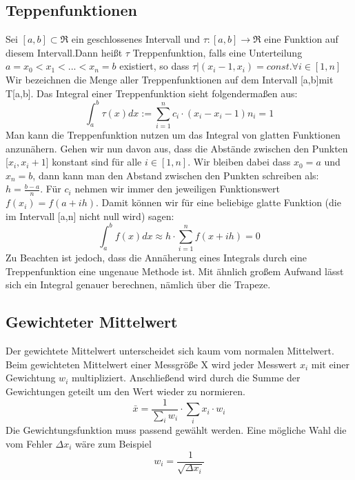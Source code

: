 \documentclass{article}
\begin{document}
    \subsection{Teppenfunktionen}
        Sei $[a,b] \subset \Re $ ein geschlossenes Intervall und $\tau:[a,b]\rightarrow\Re$ eine Funktion
        auf diesem Intervall.Dann heißt $\tau$ Treppenfunktion, falls eine Unterteilung
        $a=x_0<x_1<...<x_n=b$ existiert, so dass $\tau|(x_i-1,x_i)=const. \forall i\in [1,n]$ Wir bezeichnen die Menge aller
        Treppenfunktionen auf dem Intervall [a,b]mit T[a,b].
        Das Integral einer Treppenfunktion sieht
        folgendermaßen aus:
        \begin{equation}
            \int_a^b \tau(x)dx:=\sum_{i=1}^n c_i\cdot (x_i-x_i-1)n_i=1
        \end{equation}
        Man kann die Treppenfunktion nutzen um das Integral von glatten Funktionen anzunähern.
        Gehen wir nun davon aus, dass die Abstände zwischen den Punkten [$x_i,x_i+1$] konstant sind 
        für alle $i\in[1,n]$. Wir  bleiben  dabei  dass $x_0=a$ und $x_n=b$, dann kann man den Abstand
        zwischen den Punkten schreiben als:$h=\frac{b-a}{n}$. Für $c_i$ nehmen wir immer
        den jeweiligen Funktionswert $f(x_i)=f(a+ih)$. Damit können wir für eine beliebige glatte Funktion
        (die im Intervall [a,n] nicht null wird) sagen:
        \begin{equation}
            \int_a^b f(x)dx\approx h\cdot\sum_{i=1}^n f(x+ih)=0
        \end{equation}
        Zu Beachten ist jedoch,
        dass die Annäherung eines Integrals durch eine Treppenfunktion eine ungenaue Methode ist.
        Mit ähnlich großem Aufwand lässt sich ein Integral genauer berechnen, nämlich über die Trapeze.
    
    \subsection{Gewichteter Mittelwert}
        Der gewichtete Mittelwert unterscheidet sich kaum vom normalen Mittelwert. Beim gewichteten Mittelwert
        einer Messgröße X wird jeder Messwert $x_i$ mit einer Gewichtung $w_i$ multipliziert. Anschließend wird durch
        die Summe der Gewichtungen geteilt um den Wert wieder zu normieren.
        \begin{equation}
            \bar{x} = \frac{1}{\sum_{i}w_i}\cdot \sum_{i} x_i\cdot w_i
        \end{equation}
        Die Gewichtungsfunktion muss passend gewählt werden. Eine mögliche Wahl die vom Fehler $\Delta x_i$
        wäre zum Beispiel 
        \begin{equation}
            w_i = \frac{1}{\sqrt{\Delta x_i}}
        \end{equation}
\end{document}
